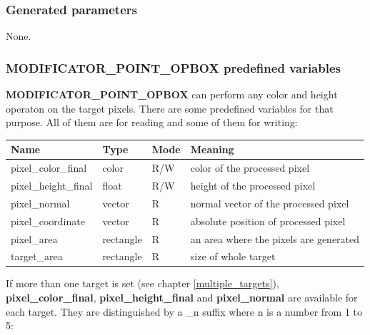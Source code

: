 \documentclass[9pt]{article}
\begin{document}
\subsubsection*{Generated parameters}

None.

\subsubsection*{MODIFICATOR\_POINT\_OPBOX predefined variables}

{\bf MODIFICATOR\_POINT\_OPBOX} can perform any color and height operaton on the target pixels.
There are some predefined variables for that purpose. All of them are for reading and 
some of them for writing:

\begin{center}
\begin{tabular}{|l||l||l||l|}
\hline
Name & Type & Mode & Meaning \\
\hline
\hline
pixel\_color\_final & color & R/W & color of the processed pixel \\
pixel\_height\_final & float & R/W & height of the processed pixel \\
pixel\_normal & vector & R & normal vector of the processed pixel \\ 
pixel\_coordinate & vector & R & absolute position of processed pixel \\
pixel\_area & rectangle & R & an area where the pixels are generated \\ 
target\_area & rectangle & R & size of whole target \\
\hline
\end{tabular}
\end{center}

If more than one target is set (see chapter \ref{multiple_targets}), 
{\bf pixel\_color\_final}, {\bf pixel\_height\_final} and {\bf pixel\_normal}
are available for each target. They are distinguished by a \_n suffix where
n is a number from 1 to 5:
\end{document}
